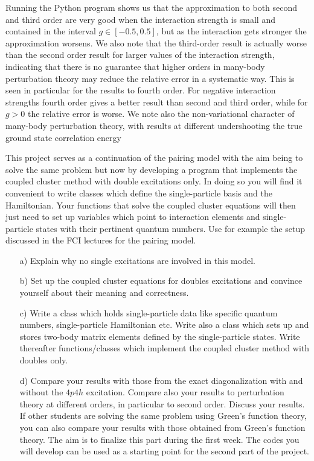 \begin{prob}
Running the Python program shows us that
the approximation to both second and third order are very
good when the interaction strength is small and contained in the interval
$g\in[-0.5,0.5]$, but as the
interaction gets stronger the approximation worsens. We also
note that the third-order result is actually worse than the second order result
for larger values of the interaction strength, indicating that there is no guarantee that higher orders
in many-body perturbation theory may reduce the relative error in a systematic way.
This is seen in particular for the results to fourth order. For negative interaction strengths
fourth order gives a better result than second and third order, while for $g>0$ the relative error is
worse.
We note also the non-variational character of many-body perturbation theory, with results at different undershooting the true ground state correlation energy

\end{prob}


\begin{prob}\label{problem:prob8.6}
This project serves as a continuation
of the pairing model with the aim being to solve the same problem but
now by developing a program that implements the coupled cluster method
with double excitations only. In doing so you will find it convenient
to write classes which define the single-particle basis and the
Hamiltonian. Your functions that solve the coupled cluster equations
will then just need to set up variables which point to interaction
elements and single-particle states with their pertinent quantum
numbers. Use for example the setup discussed in the FCI lectures for
the pairing model.

\begin{enumerate}

\item[a)]
Explain why no single excitations are involved in this model.


\item[b)]
Set up the coupled cluster equations for doubles excitations and convince yourself about their
meaning and correctness.

\item[c)]
Write a class which holds
single-particle data like specific quantum numbers, single-particle
Hamiltonian etc. Write also a class which sets up and stores two-body
matrix elements defined by the single-particle states.  Write
thereafter functions/classes which implement the coupled cluster
method with doubles only.


\item[d)]
Compare your results with
those from the exact diagonalization with and without the $4p4h$
excitation. Compare also your results to perturbation theory at
different orders, in particular to second order. Discuss your results.
If other students are solving the same problem using Green's function
theory, you can also compare your results with those obtained from
Green's function theory. The aim is to finalize this part during the
first week. The codes you will develop can be used as a starting point
for the second part of the project.
\end{enumerate}
\end{prob}


